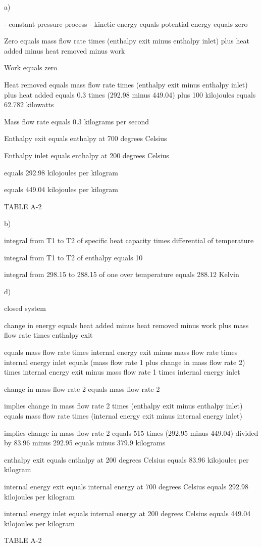 a) 

- constant pressure process
- kinetic energy equals potential energy equals zero

Zero equals mass flow rate times (enthalpy exit minus enthalpy inlet) plus heat added minus heat removed minus work

Work equals zero

Heat removed equals mass flow rate times (enthalpy exit minus enthalpy inlet) plus heat added equals 0.3 times (292.98 minus 449.04) plus 100 kilojoules equals 62.782 kilowatts

Mass flow rate equals 0.3 kilograms per second

Enthalpy exit equals enthalpy at 700 degrees Celsius

Enthalpy inlet equals enthalpy at 200 degrees Celsius

equals 292.98 kilojoules per kilogram

equals 449.04 kilojoules per kilogram

TABLE A-2

b)

integral from T1 to T2 of specific heat capacity times differential of temperature

integral from T1 to T2 of enthalpy equals 10

integral from 298.15 to 288.15 of one over temperature equals 288.12 Kelvin

d)

closed system

change in energy equals heat added minus heat removed minus work plus mass flow rate times enthalpy exit

equals mass flow rate times internal energy exit minus mass flow rate times internal energy inlet equals (mass flow rate 1 plus change in mass flow rate 2) times internal energy exit minus mass flow rate 1 times internal energy inlet

change in mass flow rate 2 equals mass flow rate 2

implies change in mass flow rate 2 times (enthalpy exit minus enthalpy inlet) equals mass flow rate times (internal energy exit minus internal energy inlet)

implies change in mass flow rate 2 equals 515 times (292.95 minus 449.04) divided by 83.96 minus 292.95 equals minus 379.9 kilograms

enthalpy exit equals enthalpy at 200 degrees Celsius equals 83.96 kilojoules per kilogram

internal energy exit equals internal energy at 700 degrees Celsius equals 292.98 kilojoules per kilogram

internal energy inlet equals internal energy at 200 degrees Celsius equals 449.04 kilojoules per kilogram

TABLE A-2